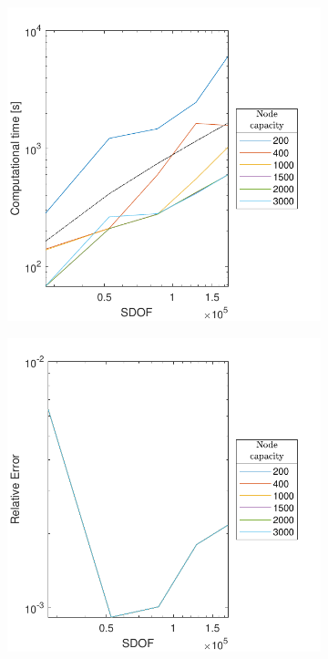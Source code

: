 \begin{figure}[ht]
     \centering
     \begin{subfigure}[b]{0.49\textwidth}
         \centering
         \includegraphics[width=\textwidth]{Images/KIFMM/Graphs/NodeCapTime.pdf}
         \caption{\label{fig:NodeCapTime}}
     \end{subfigure}
     \hfill
     \begin{subfigure}[b]{0.49\textwidth}
         \centering
         \includegraphics[width=\textwidth]{Images/KIFMM/Graphs/NodeCapError.pdf}

\end{subfigure}
\end{figure}
